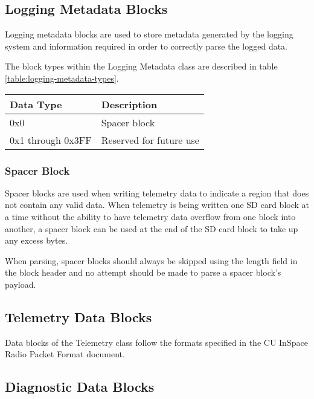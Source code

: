 \subsection{Logging Metadata Blocks}
\label{subsec:logging-metadata-blocks}

Logging metadata blocks are used to store metadata generated by the logging system and information required in order to
correctly parse the logged data.

The block types within the Logging Metadata class are described in table \ref{table:logging-metadata-types}.

\begin{table*}[htb]
	\centering
	\begin{tabular}{@{}ll@{}}
		\toprule
		Data Type         & Description             \\
		\midrule
		0x0               & Spacer block            \\
		0x1 through 0x3FF & Reserved for future use \\
		\bottomrule
	\end{tabular}
	\caption{Logging metadata block types}
	\label{table:logging-metadata-types}
\end{table*}

\subsubsection{Spacer Block}

Spacer blocks are used when writing telemetry data to indicate a region that does not contain any valid data. When
telemetry is being written one SD card block at a time without the ability to have telemetry data overflow from one
block into another, a spacer block can be used at the end of the SD card block to take up any excess bytes.

When parsing, spacer blocks should always be skipped using the length field in the block header and no attempt should
be made to parse a spacer block's payload.

\subsection{Telemetry Data Blocks}
\label{subsec:telemetry-data-blocks}

Data blocks of the Telemetry class follow the formats specified in the CU InSpace Radio Packet Format document.

\subsection{Diagnostic Data Blocks}
\label{subsec:diagnostic-data-blocks}

